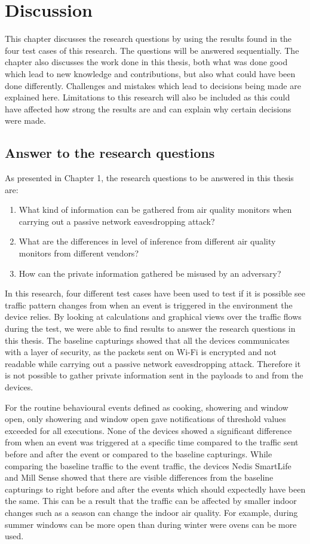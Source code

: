 \chapter{Discussion}
This chapter discusses the research questions by using the results found in the four test cases of this research. The questions will be answered sequentially. The chapter also discusses the work done in this thesis, both what was done good which lead to new knowledge and contributions, but also what could have been done differently. Challenges and mistakes which lead to decisions being made are explained here. Limitations to this research will also be included as this could have affected how strong the results are and can explain why certain decisions were made. 
\section{Answer to the research questions}
As presented in Chapter 1, the research questions to be answered in this thesis are:

\begin{enumerate}
    \item What kind of information can be gathered from air quality monitors when carrying out a passive network eavesdropping attack?
    \item What are the differences in level of inference from different air quality monitors from different vendors?
    \item How can the private information gathered be misused by an adversary?
\end{enumerate}

In this research, four different test cases have been used to test if it is possible see traffic pattern changes from when an event is triggered in the environment the device relies. By looking at calculations and graphical views over the traffic flows during the test, we were able to find results to answer the research questions in this thesis. The baseline capturings showed that all the devices communicates with a layer of security, as the packets sent on \gls{Wi-Fi} is encrypted and not readable while carrying out a passive network eavesdropping attack. Therefore it is not possible to gather private information sent in the payloads to and from the devices. 

For the routine behavioural events defined as cooking, showering and window open, only showering and window open gave notifications of threshold values exceeded for all executions. None of the devices showed a significant difference from when an event was triggered at a specific time compared to the traffic sent before and after the event or compared to the baseline capturings. While comparing the baseline traffic to the event traffic, the devices Nedis SmartLife and Mill Sense showed that there are visible differences from the baseline capturings to right before and after the events which should expectedly have been the same. This can be a result that the traffic can be affected by smaller indoor changes such as a season can change the indoor air quality. For example, during summer windows can be more open than during winter were ovens can be more used. 

